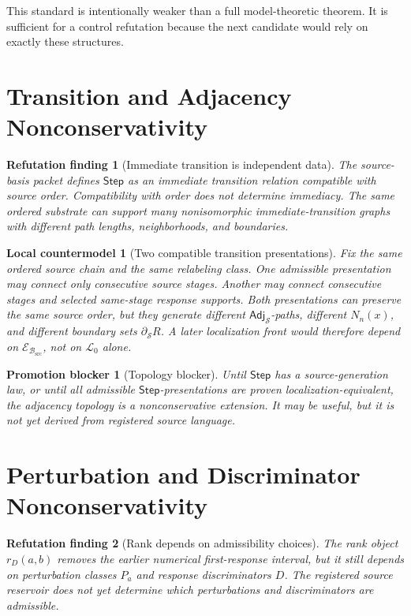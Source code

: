 \documentclass[11pt]{article}
\newcommand{\Step}{\mathsf{Step}}
\newcommand{\Adj}{\mathsf{Adj}_{\mathcal{S}}}
\newcommand{\Basis}{\mathcal{B}_{\mathrm{src}}}
\newcommand{\Lang}{\mathcal{L}_{0}}
\newcommand{\Ext}{\mathcal{E}_{\Basis}}
\newtheorem{refutationfinding}{Refutation finding}
\newtheorem{countermodel}{Local countermodel}
\newtheorem{blocker}{Promotion blocker}
\begin{document}
This standard is intentionally weaker than a full model-theoretic theorem. It
is sufficient for a control refutation because the next candidate would rely
on exactly these structures.

\section{Transition and Adjacency Nonconservativity}

\begin{refutationfinding}[Immediate transition is independent data]
The source-basis packet defines \(\Step\) as an immediate transition relation
compatible with source order. Compatibility with order does not determine
immediacy. The same ordered substrate can support many nonisomorphic
immediate-transition graphs with different path lengths, neighborhoods, and
boundaries.
\end{refutationfinding}

\begin{countermodel}[Two compatible transition presentations]
Fix the same ordered source chain and the same relabeling class. One
admissible presentation may connect only consecutive source stages. Another
may connect consecutive stages and selected same-stage response supports.
Both presentations can preserve the same source order, but they generate
different \(\Adj\)-paths, different \(N_n(x)\), and different boundary sets
\(\partial_{\mathcal{S}}R\). A later localization front would therefore
depend on \(\Ext\), not on \(\Lang\) alone.
\end{countermodel}

\begin{blocker}[Topology blocker]
Until \(\Step\) has a source-generation law, or until all admissible
\(\Step\)-presentations are proven localization-equivalent, the adjacency
topology is a nonconservative extension. It may be useful, but it is not yet
derived from registered source language.
\end{blocker}

\section{Perturbation and Discriminator Nonconservativity}

\begin{refutationfinding}[Rank depends on admissibility choices]
The rank object \(r_D(a,b)\) removes the earlier numerical first-response
interval, but it still depends on perturbation classes \(P_a\) and response
discriminators \(D\). The registered source reservoir does not yet determine
which perturbations and discriminators are admissible.
\end{refutationfinding}
\end{document}
